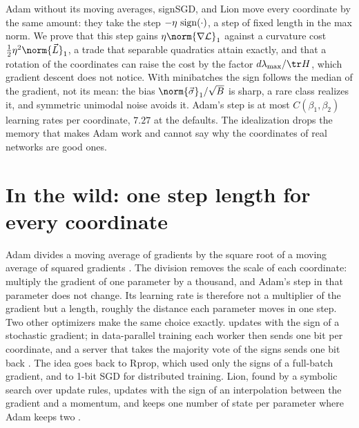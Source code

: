 
\begin{refsection}

\begin{chaptersummary}
Adam without its moving averages, signSGD, and Lion move every coordinate by the same amount: they take the step $-\eta\,\operatorname{sign}(\cdot)$, a step of fixed length in the max norm. We prove that this step gains $\eta\norm{\nabla\Loss}_1$ against a curvature cost $\frac12\eta^2\norm{\vec L}_1$, a trade that separable quadratics attain exactly, and that a rotation of the coordinates can raise the cost by the factor $d\lmax/\tr H$, which gradient descent does not notice. With minibatches the sign follows the median of the gradient, not its mean: the bias $\norm{\vec\sigma}_1/\sqrt B$ is sharp, a rare class realizes it, and symmetric unimodal noise avoids it. Adam's step is at most $C(\beta_1,\beta_2)$ learning rates per coordinate, $7.27$ at the defaults. The idealization drops the memory that makes Adam work and cannot say why the coordinates of real networks are good ones.
\end{chaptersummary}

\section{In the wild: one step length for every coordinate}\label{sec:sign:wild}

Adam divides a moving average of gradients by the square root of a moving average of squared gradients \parencite{KingmaBa2015}. The division removes the scale of each coordinate: multiply the gradient of one parameter by a thousand, and Adam's step in that parameter does not change. Its learning rate is therefore not a multiplier of the gradient but a length, roughly the distance each parameter moves in one step. Two other optimizers make the same choice exactly.  updates with the sign of a stochastic gradient; in data-parallel training each worker then sends one bit per coordinate, and a server that takes the majority vote of the signs sends one bit back \parencite{BernsteinEtAl2018,BernsteinEtAl2019}. The idea goes back to Rprop, which used only the signs of a full-batch gradient, and to 1-bit SGD for distributed training. Lion, found by a symbolic search over update rules, updates with the sign of an interpolation between the gradient and a momentum, and keeps one number of state per parameter where Adam keeps two \parencite{ChenEtAl2023}.


\end{refsection}
